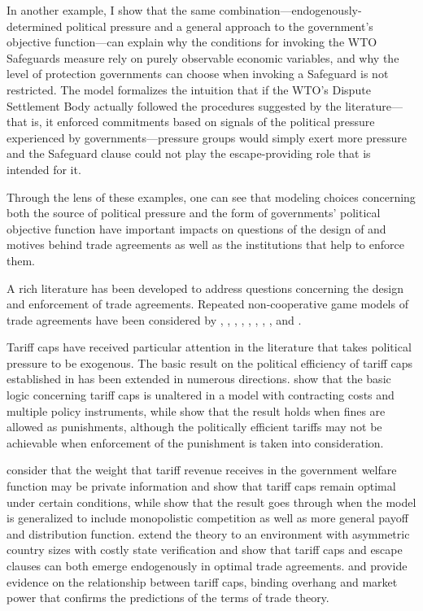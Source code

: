 In another example, I show that the same combination---endogenously-determined political pressure and a general approach to the government's objective function---can explain why the conditions for invoking the WTO Safeguards measure rely on purely observable economic variables, and why the level of protection governments can choose when invoking a Safeguard is not restricted. The model formalizes the intuition that if the WTO's Dispute Settlement Body actually followed the procedures suggested by the literature---that is, it enforced commitments based on signals of the political pressure experienced by governments---pressure groups would simply exert more pressure and the Safeguard clause could not play the escape-providing role that is intended for it.

Through the lens of these examples, one can see that modeling choices concerning both the source of political pressure and the form of governments' political objective function have important impacts on questions of the design of and motives behind trade agreements as well as the institutions that help to enforce them.

A rich literature has been developed to address questions concerning the design and enforcement of trade agreements. Repeated non-cooperative game models of trade agreements have been considered by \Textcite{mcm86,mcm89}, \Textcite{dixit1987}, \Textcite{bs1990, bs1997a, bs1997b, bs2002}, \Textcite{kovthurs}, \Textcite{maggi99}, \Textcite{ederington}, \Textcite{rosendorff}, \Textcite{bagwell2009}, and \Textcite{park}.

Tariff caps have received particular attention in the literature that takes political pressure to be exogenous. The basic result on the political efficiency of tariff caps established in \Textcite{bs2005} has been extended in numerous directions. \Textcite{hms} show that the basic logic concerning tariff caps is unaltered in a model with contracting costs and multiple policy instruments, while \Textcite{ls} show that the result holds when fines are allowed as punishments, although the politically efficient tariffs may not be achievable when enforcement of the punishment is taken into consideration. 

\Textcite{ab2012} consider that the weight that tariff revenue receives in the government welfare function may be private information and show that tariff caps remain optimal under certain conditions, while \Textcite{ab2013} show that the result goes through when the \Textcite{bs2005} model is generalized to include monopolistic competition as well as more general payoff and distribution function. \Textcite{bb} extend the theory to an environment with asymmetric country sizes with costly state verification and show that tariff caps and escape clauses can both emerge endogenously in optimal trade agreements. \Textcite{bbr} and \Textcite{nos} provide evidence on the relationship between tariff caps, binding overhang and market power that confirms the predictions of the terms of trade theory.

